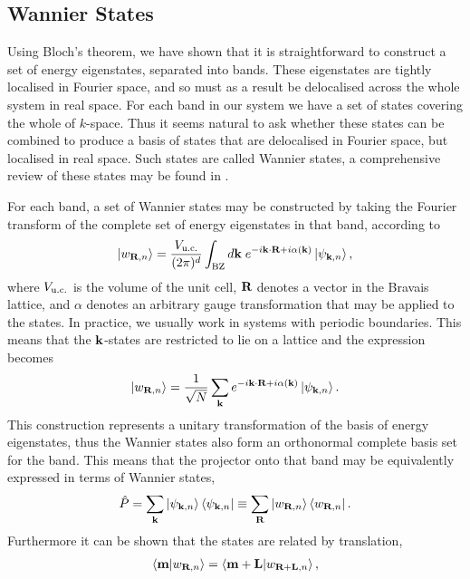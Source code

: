 \subsection{Wannier States}\label{sec:wannier_states}
Using Bloch's theorem, we have shown that it is straightforward to construct a set of energy eigenstates, separated into bands. These eigenstates are tightly localised in Fourier space, and so must as a result be delocalised across the whole system in real space. For each band in our system we have a set of states covering the whole of $k$-space. Thus it seems natural to ask whether these states can be combined to produce a basis of states that are delocalised in Fourier space, but localised in real space. Such states are called Wannier states, a  comprehensive review of these states may be found in \cite{marzari_maximally_2012}. \par
For each band, a set of Wannier states may be constructed by taking the Fourier transform of the complete set of energy eigenstates in that band, according to
\begin{align}
	\ket{w_{\bf R, n}} = \frac{V_{\textup{u.c.}}}{(2 \pi)^d } \int _{\textup{BZ}} d\bf k\; e^{-i \bf k \cdot \bf R + i \alpha(\bf k)} \ket{\psi _{\bf k, n}},
\end{align}
where $ V_{\textup{u.c.}}$ is the volume of the unit cell, $\bf R$ denotes a vector in the Bravais lattice, and $\alpha $ denotes an arbitrary gauge transformation that may be applied to the states. In practice, we usually work in systems with periodic boundaries. This means that the $\bf k$-states are restricted to lie on a lattice and the expression becomes
\begin{align}
	\ket{w_{\bf R, n}} = \frac{1}{\sqrt N } \sum _{\bf k}  e^{-i \bf k \cdot \bf R + i \alpha(\bf k)} \ket{\psi _{\bf k, n}}.
\end{align}
This construction represents a unitary transformation of the basis of energy eigenstates, thus the Wannier states also form an orthonormal complete basis set for the band. This means that the projector onto that band may be equivalently expressed in terms of Wannier states,
\begin{align}
	\hat P = \sum_{\bf k} \ket{\psi _{\bf k, n}}\bra{\psi _{\bf k, n}} \equiv \sum_{\bf R} \ket{w_{\bf R, n}} \bra{w_{\bf R, n}}.
\end{align}
Furthermore it can be shown that the states are related by translation,
\begin{align}
	\braket{\bf m | w_{\bf R, n} } = \braket{\bf m + \bf L | w_{\bf R + \bf L, n} },
\end{align}

